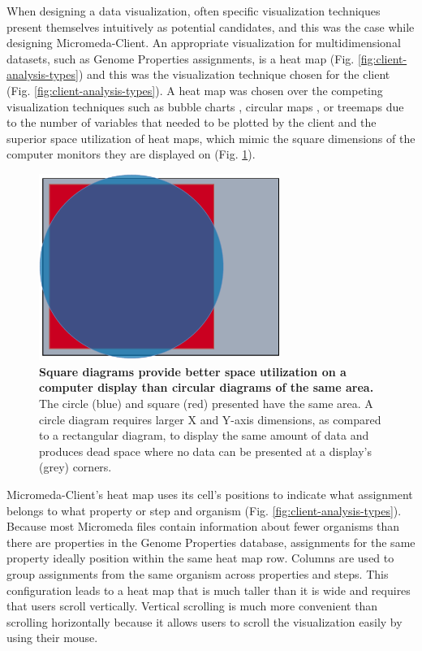 When designing a data visualization, often specific visualization techniques present themselves intuitively as potential candidates, and this was the case while designing Micromeda-Client. An appropriate visualization for multidimensional datasets, such as Genome Properties assignments, is a heat map \cite{wilkinson2009history,tufte2001visual}(Fig. \ref{fig:client-analysis-types}) and this was the visualization technique chosen for the client (Fig. \ref{fig:client-analysis-types}). A heat map was chosen over the competing visualization techniques such as bubble charts \cite{tufte2001visual}, circular maps \cite{ward2002taxonomy,stothard2004circular}, or treemaps \cite{shneiderman1998tree} due to the number of variables that needed to be plotted by the client and the superior space utilization of heat maps, which mimic the square dimensions of the computer monitors they are displayed on (Fig. \ref{fig:circle-square}).

\begin{figure}[!ht]
  \centering
	\includegraphics[width=0.7\textwidth]{media/square_vs_circle.pdf}
	 \caption[Square diagrams provide better space utilization on a computer display than circular diagrams of the same area.]{\textbf{Square diagrams provide better space utilization on a computer display than circular diagrams of the same area.} The circle (blue) and square (red) presented have the same area. A circle diagram requires larger X and Y-axis dimensions, as compared to a rectangular diagram, to display the same amount of data and produces dead space where no data can be presented at a display's (grey) corners.}
	 \label{fig:circle-square}
\end{figure}

Micromeda-Client's heat map uses its cell's positions to indicate what assignment belongs to what property or step and organism (Fig. \ref{fig:client-analysis-types}). Because most Micromeda files contain information about fewer organisms than there are properties in the Genome Properties database, assignments for the same property ideally position within the same heat map row. Columns are used to group assignments from the same organism across properties and steps. This configuration leads to a heat map that is much taller than it is wide and requires that users scroll vertically. Vertical scrolling is much more convenient than scrolling horizontally because it allows users to scroll the visualization easily by using their mouse.

